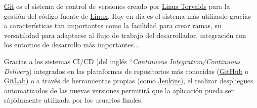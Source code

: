 \documentclass{\ClassPath/viu-tfm-template}
\begin{document}
\href{https://es.wikipedia.org/wiki/Git}{Git} es el sistema de control de versiones creado por \href{https://es.wikipedia.org/wiki/Linus_Torvalds}{Linus Torvalds} para la gestión del código fuente de \href{https://es.wikipedia.org/wiki/N%C3%BAcleo_Linux}{Linux}. Hoy en día es el sistema más utilizado gracias a características tan importantes como la facilidad para crear ramas, su versatilidad para adaptarse al flujo de trabajo del desarrollador, integración con los entornos de desarrollo más importantes...

Gracias a los sistemas CI/CD (del inglés “\textit{Continuous Integration/Continuous Delivery}) integrados en las plataformas de repositorios más conocidas (\href{https://github.com/}{GitHub} o \href{https://about.gitlab.com/}{GitLab}) o a través de herramientas propias (como \href{https://www.jenkins.io/}{Jenkins}), el realizar despliegues automatizados de las nuevas versiones permitirá que la aplicación pueda ser rápidamente utilizada por los usuarios finales.

%
%


%
%
\end{document}
